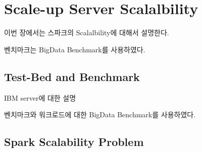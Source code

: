\section{Scale-up Server Scalalbility}


\ifkor
이번 장에서는 스파크의 Scalalbility에 대해서 설명한다.
\else

\fi

\ifkor
벤치마크는 BigData Benchmark를 사용하였다.
\else

\fi

\subsection{Test-Bed and Benchmark}

\ifkor
IBM server에 대한 설명 
\else

\fi


\ifkor
벤치마크와 워크로드에 대한 BigData Benchmark를 사용하였다.
\else

\fi

\subsection{Spark Scalability Problem}


